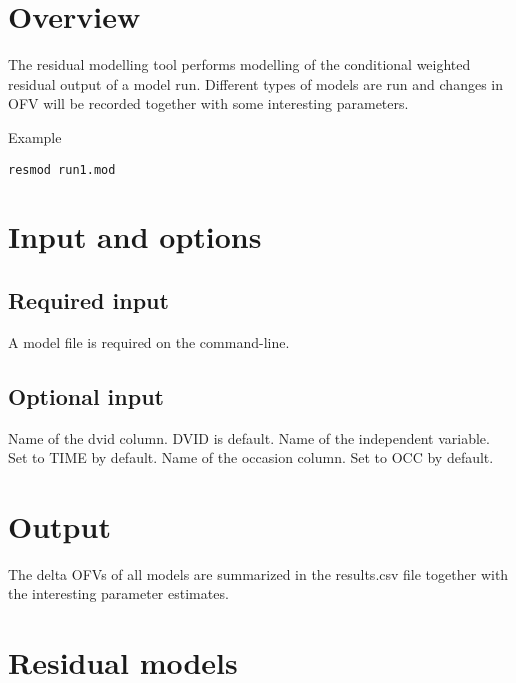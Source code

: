 



\maketitle
\newcommand{\guidetoolname}{resmod}


\section{Overview}
The residual modelling tool performs modelling of the conditional weighted residual output of a model run. Different types of models are run and changes in OFV will be recorded together with some interesting parameters.

Example
\begin{verbatim}
resmod run1.mod
\end{verbatim}

\section{Input and options}

\subsection{Required input}
A model file is required on the command-line.

\subsection{Optional input}

\begin{optionlist}
Name of the dvid column. DVID is default.
\nextopt
{}
Name of the independent variable. Set to TIME by default.
\nextopt
{}
Name of the occasion column. Set to OCC by default.
\nextopt
\end{optionlist}

\section{Output}
The delta OFVs of all models are summarized in the results.csv file together with the interesting parameter estimates.

\section{Residual models}

